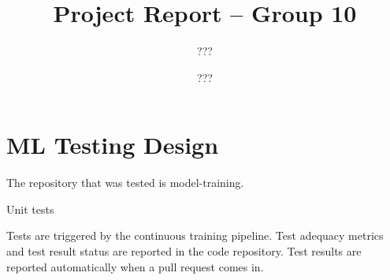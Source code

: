 \documentclass[sigconf,nonacm]{acmart}
\title{Project Report -- Group 10}
\author{???}
\author{???}
\begin{document}

% 

\maketitle

\section{ML Testing Design}

The repository that was tested is model-training.

Unit tests

Tests are triggered by the continuous training pipeline. Test adequacy metrics and test result status
are reported in the code repository. Test results are reported automatically when a pull request
comes in.

% 
% 
% 




\end{document}
